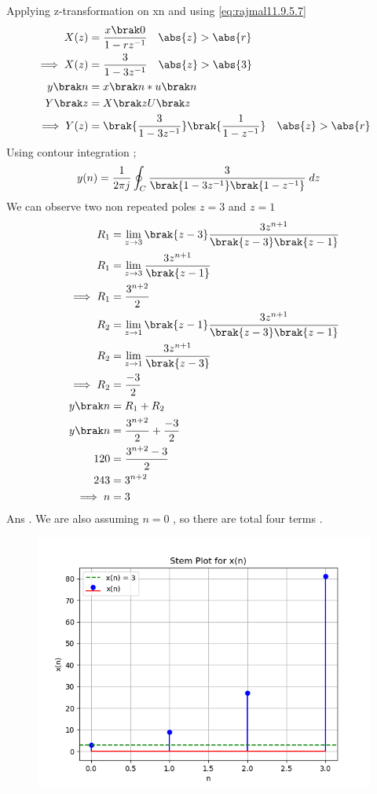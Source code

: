 \documentclass[journal,12pt,twocolumn]{IEEEtran}
\theoremstyle{remark}
\begin{document}
Applying z-transformation on x\brak n and using  \eqref{eq:rajmal11.9.5.7}
\begin{align}
X(z) &=\frac{x \brak 0}{1-rz^{-1}} \quad \abs{z} > \abs{r}\\
\implies X(z) &=\frac{3}{1-3z^{-1}} \quad \abs{z} > \abs{3}\\
y \brak n &= x\brak n*u\brak n\\
Y \brak z &= X\brak zU\brak z\\
\implies Y(z)&=\brak{\frac{3}{1-3 z^{-1}}}\brak{\frac{1}{1- z^{-1}}}  \quad \abs{z} > \abs{r}
\end{align}
Using contour integration  ;
\begin{align}
   y(n) &=\frac{1}{2\pi j}\oint_{C}{\frac{3}{\brak{1-3 z^{-1}}\brak{1- z^{-1}}}}  \;dz 
\end{align}
We can observe two non repeated poles $z=3$ and $z=1$
\begin{align}
    R_1&=\lim\limits_{z\to 3} \brak{z-3} \frac{3 z^{n+1}}{\brak{z-3}\brak{z-1}}\\
    R_1&=\lim\limits_{z\to 3}\frac{3 z^{n+1}}{\brak{z-1}}\\
  \implies  R_1&=\frac{3^{n+2}}{2}\\
   R_2&=\lim\limits_{z\to 1} \brak{z-1} \frac{3 z^{n+1}}{\brak{z-3}\brak{z-1}}\\
    R_2&=\lim\limits_{z\to 1}\frac{3 z^{n+1}}{\brak{z-3}}\\
  \implies  R_2&=\frac{-3}{2}\\
  y\brak n&= R_1+R_2\\
   y\brak n&=\frac{3^{n+2}}{2}+\frac{-3}{2} \\
   120&=\frac{3^{n+2}-3}{2} \\
   243&= 3^{n+2}\\
   \implies n&=3
\end{align}
Ans . We are also assuming $n=0$ , so there are total four terms .
\newpage
\begin{figure}
   \includegraphics[width=1\linewidth]{figs/i1.png}
\end{figure}
\end{document}
